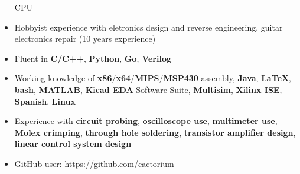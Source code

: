 \documentclass{my_resume}
\begin{document}
\begin{itemize}
        CPU
    \item Hobbyist experience with eletronics design and reverse engineering, 
        guitar electronics repair (10 years experience)
    \item Fluent in \textbf{C/C++}, \textbf{Python}, \textbf{Go}, \textbf{Verilog}
	\item Working knowledge of \textbf{x86}/\textbf{x64}/\textbf{MIPS}/\textbf{MSP430} assembly,
            \textbf{Java}, \textbf{LaTeX}, \textbf{bash}, \textbf{MATLAB},
            \textbf{Kicad EDA} Software Suite, \textbf{Multisim}, \textbf{Xilinx ISE},
            \textbf{Spanish}, \textbf{Linux}
    \item Experience with \textbf{circuit probing}, \textbf{oscilloscope use},
            \textbf{multimeter use}, \textbf{Molex crimping},
            \textbf{through hole soldering}, \textbf{transistor amplifier design},
            \textbf{linear control system design}
    \item GitHub user: \url{https://github.com/cactorium}
\end{itemize}
\end{document}

